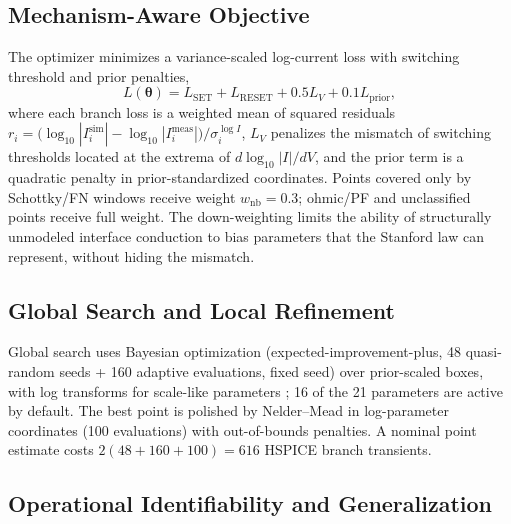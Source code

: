 \documentclass[journal]{IEEEtran}
\begin{document}
\subsection{Mechanism-Aware Objective}
\label{sec:loss}

The optimizer minimizes a variance-scaled log-current loss with switching
threshold and prior penalties,
\begin{equation}
  L(\boldsymbol{\theta})
  =
  L_{\mathrm{SET}}+L_{\mathrm{RESET}}
  +0.5L_V+0.1L_{\mathrm{prior}},
  \label{eq:loss}
\end{equation}
where each branch loss is a weighted mean of squared residuals
$r_i=\bigl(\log_{10}|I_i^{\mathrm{sim}}|-\log_{10}|I_i^{\mathrm{meas}}|
\bigr)/\sigma_i^{\log I}$, $L_V$ penalizes the mismatch of switching
thresholds located at the extrema of $d\log_{10}|I|/dV$, and the prior term
is a quadratic penalty in prior-standardized coordinates.  Points covered
only by Schottky/FN windows receive weight $w_{\mathrm{nb}}=0.3$; ohmic/PF
and unclassified points receive full weight.  The down-weighting limits the
ability of structurally unmodeled interface conduction to bias parameters
that the Stanford law can represent, without hiding the mismatch.

\subsection{Global Search and Local Refinement}
\label{sec:opt}

Global search uses Bayesian optimization (expected-improvement-plus, 48
quasi-random seeds + 160 adaptive evaluations, fixed seed) over prior-scaled
boxes, with log transforms for scale-like parameters
\cite{snoek2012practical,shahriari2016}; 16 of the 21 parameters are active by
default.  The best point is polished by Nelder--Mead in log-parameter
coordinates (100 evaluations) with out-of-bounds penalties.  A nominal point
estimate costs $2(48+160+100)=616$ HSPICE branch transients.

\subsection{Operational Identifiability and Generalization}
\label{sec:ident}
\end{document}
